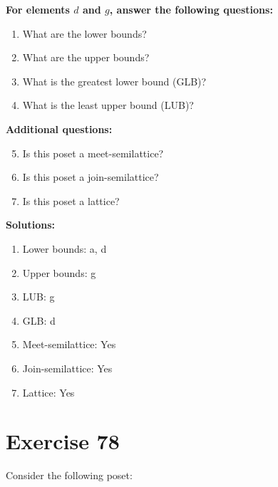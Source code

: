 \documentclass{article}
\begin{document}
    \textbf{For elements $d$ and $g$, answer the following questions:}
\begin{enumerate}
    \item What are the lower bounds?
    \item What are the upper bounds?
    \item What is the greatest lower bound (GLB)?
    \item What is the least upper bound (LUB)?
\end{enumerate}
    \hspace*{3ex} \textbf{Additional questions:}
\begin{enumerate}
    \setcounter{enumi}{4}
    \item Is this poset a meet-semilattice?
    \item Is this poset a join-semilattice?
    \item Is this poset a lattice?
\end{enumerate}

\textbf{Solutions:}
\begin{enumerate}
    \item Lower bounds: {a, d}
    \item Upper bounds: {g}
    \item LUB: g
    \item GLB: d
    \item Meet-semilattice: Yes
    \item Join-semilattice: Yes
    \item Lattice: Yes
\end{enumerate}
\newpage
\section*{Exercise 78}
Consider the following poset:
\begin{center}
\end{center}
\end{document}
